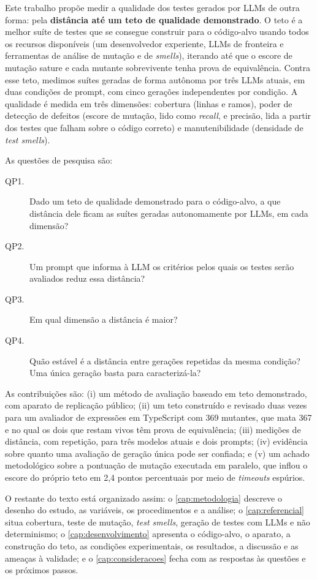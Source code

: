 Este trabalho propõe medir a qualidade dos testes gerados por LLMs de outra forma: pela \textbf{distância até um teto de qualidade demonstrado}. O teto é a melhor suíte de testes que se consegue construir para o código-alvo usando todos os recursos disponíveis (um desenvolvedor experiente, LLMs de fronteira e ferramentas de análise de mutação e de \textit{smells}), iterando até que o escore de mutação sature e cada mutante sobrevivente tenha prova de equivalência. Contra esse teto, medimos suítes geradas de forma autônoma por três LLMs atuais, em duas condições de prompt, com cinco gerações independentes por condição. A qualidade é medida em três dimensões: cobertura (linhas e ramos), poder de detecção de defeitos (escore de mutação, lido como \textit{recall}, e precisão, lida a partir dos testes que falham sobre o código correto) e manutenibilidade (densidade de \textit{test smells}).

As questões de pesquisa são:

\begin{description}
    \item[QP1.] Dado um teto de qualidade demonstrado para o código-alvo, a que distância dele ficam as suítes geradas autonomamente por LLMs, em cada dimensão?
    \item[QP2.] Um prompt que informa à LLM os critérios pelos quais os testes serão avaliados reduz essa distância?
    \item[QP3.] Em qual dimensão a distância é maior?
    \item[QP4.] Quão estável é a distância entre gerações repetidas da mesma condição? Uma única geração basta para caracterizá-la?
\end{description}

As contribuições são: (i) um método de avaliação baseado em teto demonstrado, com aparato de replicação público; (ii) um teto construído e revisado duas vezes para um avaliador de expressões em TypeScript com 369 mutantes, que mata 367 e no qual os dois que restam vivos têm prova de equivalência; (iii) medições de distância, com repetição, para três modelos atuais e dois prompts; (iv) evidência sobre quanto uma avaliação de geração única pode ser confiada; e (v) um achado metodológico sobre a pontuação de mutação executada em paralelo, que inflou o escore do próprio teto em 2,4 pontos percentuais por meio de \textit{timeouts} espúrios.

O restante do texto está organizado assim: o \autoref{cap:metodologia} descreve o desenho do estudo, as variáveis, os procedimentos e a análise; o \autoref{cap:referencial} situa cobertura, teste de mutação, \textit{test smells}, geração de testes com LLMs e não determinismo; o \autoref{cap:desenvolvimento} apresenta o código-alvo, o aparato, a construção do teto, as condições experimentais, os resultados, a discussão e as ameaças à validade; e o \autoref{cap:consideracoes} fecha com as respostas às questões e os próximos passos.
